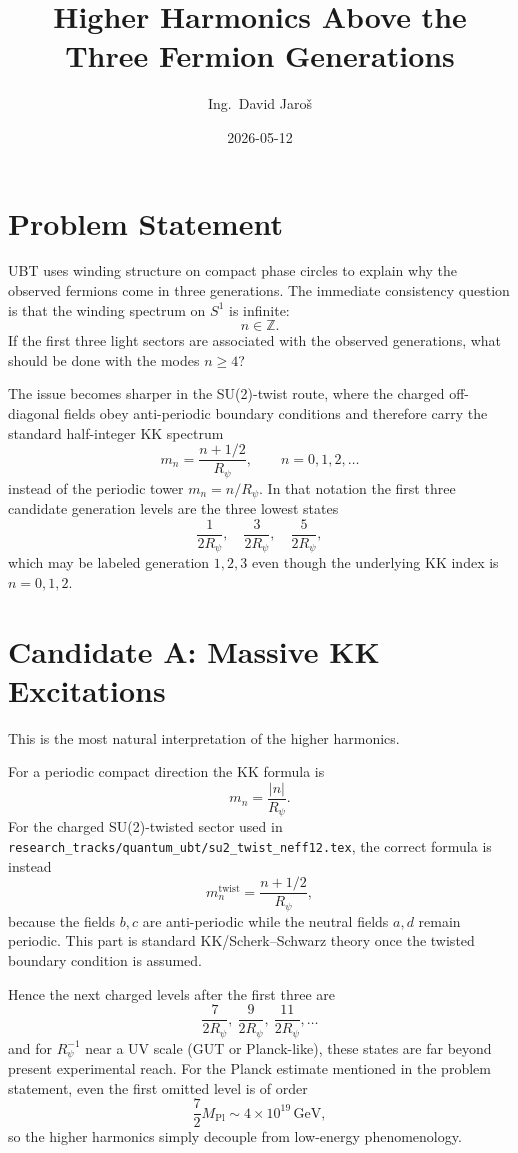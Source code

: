 \documentclass[12pt,a4paper]{article}
\title{Higher Harmonics Above the Three Fermion Generations}
\author{Ing.\ David Jaro\v{s}}
\date{2026-05-12}
\begin{document}
\maketitle

\section{Problem Statement}

UBT uses winding structure on compact phase circles to explain why the observed
fermions come in three generations.  The immediate consistency question is that
the winding spectrum on \(S^1\) is infinite:
\[
n\in\mathbb{Z}.
\]
If the first three light sectors are associated with the observed generations,
what should be done with the modes \(n\ge 4\)?

The issue becomes sharper in the SU(2)-twist route, where the charged
off-diagonal fields obey anti-periodic boundary conditions and therefore carry
the standard half-integer KK spectrum
\[
m_n=\frac{n+1/2}{R_\psi},\qquad n=0,1,2,\dots
\]
instead of the periodic tower \(m_n=n/R_\psi\).  In that notation the first
three candidate generation levels are the three lowest states
\[
\frac{1}{2R_\psi},\quad \frac{3}{2R_\psi},\quad \frac{5}{2R_\psi},
\]
which may be labeled generation \(1,2,3\) even though the underlying KK index is
\(n=0,1,2\).

\section{Candidate A: Massive KK Excitations}

This is the most natural interpretation of the higher harmonics.

For a periodic compact direction the KK formula is
\[
m_n=\frac{|n|}{R_\psi}.
\]
For the charged SU(2)-twisted sector used in
\texttt{research\_tracks/quantum\_ubt/su2\_twist\_neff12.tex}, the correct
formula is instead
\[
m_n^{\mathrm{twist}}=\frac{n+1/2}{R_\psi},
\]
because the fields \(b,c\) are anti-periodic while the neutral fields \(a,d\)
remain periodic.  This part is standard KK/Scherk--Schwarz theory once the
twisted boundary condition is assumed.

Hence the next charged levels after the first three are
\[
\frac{7}{2R_\psi},\ \frac{9}{2R_\psi},\ \frac{11}{2R_\psi},\dots
\]
and for \(R_\psi^{-1}\) near a UV scale (GUT or Planck-like), these states are
far beyond present experimental reach.  For the Planck estimate mentioned in the
problem statement, even the first omitted level is of order
\[
\frac{7}{2}M_{\mathrm{Pl}}\sim 4\times10^{19}\,\mathrm{GeV},
\]
so the higher harmonics simply decouple from low-energy phenomenology.
\end{document}
